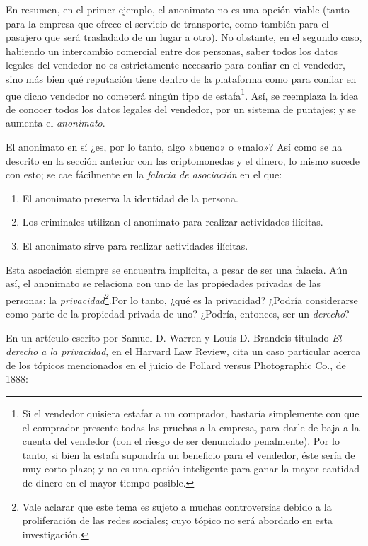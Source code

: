 \documentclass[12pt,a4paper,twoside]{book}
\begin{document}
En resumen, en el primer ejemplo, el anonimato no es una opción viable (tanto para la empresa que ofrece el servicio de transporte, como también para el pasajero que será trasladado de un lugar a otro). No obstante, en el segundo caso, habiendo un intercambio comercial entre dos personas, saber todos los datos legales del vendedor no es estrictamente necesario para confiar en el vendedor, sino más bien qué reputación tiene dentro de la plataforma como para confiar en que dicho vendedor no cometerá ningún tipo de estafa\footnote{Si el vendedor quisiera estafar a un comprador, bastaría simplemente con que el comprador presente todas las pruebas a la empresa, para darle de baja a la cuenta del vendedor (con el riesgo de ser denunciado penalmente). Por lo tanto, si bien la estafa supondría un beneficio para el vendedor, éste sería de muy corto plazo; y no es una opción inteligente para ganar la mayor cantidad de dinero en el mayor tiempo posible.}. Así, se reemplaza la idea de conocer todos los datos legales del vendedor, por un sistema de puntajes; y se aumenta el \textit{anonimato}.

El anonimato en sí ¿es, por lo tanto, algo «bueno» o «malo»? Así como se ha descrito en la sección anterior con las criptomonedas y el dinero, lo mismo sucede con esto; se cae fácilmente en la \textit{falacia de asociación} en el que:

\begin{enumerate}
\item El anonimato preserva la identidad de la persona.
\item Los criminales utilizan el anonimato para realizar actividades ilícitas.
\item El anonimato sirve para realizar actividades ilícitas.
\end{enumerate}

Esta asociación siempre se encuentra implícita, a pesar de ser una falacia. Aún así, el anonimato se relaciona con uno de las propiedades privadas de las personas: la \textit{privacidad}\footnote{Vale aclarar que este tema es sujeto a muchas controversias debido a la proliferación de las redes sociales; cuyo tópico no será abordado en esta investigación.}.Por lo tanto, ¿qué es la privacidad? ¿Podría considerarse como parte de la propiedad privada de uno? ¿Podría, entonces, ser un \textit{derecho}?

En un artículo escrito por Samuel D. Warren y Louis D. Brandeis titulado \textit{El derecho a la privacidad}, en el Harvard Law Review, cita un caso particular acerca de los tópicos mencionados en el juicio de Pollard versus Photographic Co., de 1888:
\end{document}

